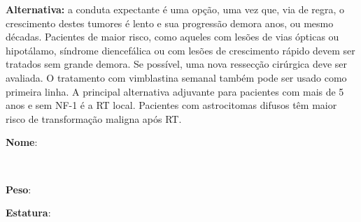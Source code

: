 \documentclass[11pt,a4paper,oldfontcommands]{memoir}
\def\entrywithlabel[#1]#2{\parbox{#1}{{\small #2:} \hrulefill}}
\begin{document}
\textbf{Alternativa:} a conduta expectante é uma opção, uma vez que, via de regra, o crescimento destes tumores é lento e sua progressão demora anos, ou mesmo décadas. Pacientes de maior risco, como aqueles com lesões de vias ópticas ou hipotálamo, síndrome diencefálica ou com lesões de crescimento rápido devem ser tratados sem grande demora. Se possível, uma nova ressecção cirúrgica deve ser avaliada. O tratamento com vimblastina semanal também pode ser usado como primeira linha. A principal alternativa adjuvante para pacientes com mais de 5 anos e sem NF-1 é a RT local. Pacientes com astrocitomas difusos têm maior risco de transformação maligna após RT.
\\[0.4cm]
\entrywithlabel[1\hsize]{\textbf{Nome}}\hfill
\\[0.3cm]
\entrywithlabel[.45\hsize]{\textbf{Peso}}\hfill  \entrywithlabel[.45\hsize]{\textbf{Estatura}}
\end{document}
